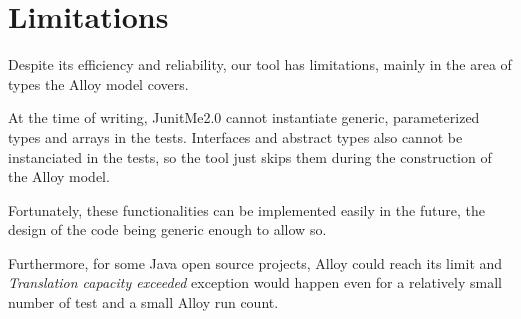 \section{Limitations}
	Despite its efficiency and reliability, our tool has limitations, mainly in the area of types the Alloy model covers.
	
	At the time of writing, JunitMe2.0 cannot instantiate generic, parameterized types and arrays in the tests.
	Interfaces and abstract types also cannot be instanciated in the tests, so the tool just skips them during the construction of the Alloy model.
	
	Fortunately, these functionalities can be implemented easily in the future, the design of the code being generic enough to allow so.
	
	Furthermore, for some Java open source projects, Alloy could reach its limit and \textit{Translation capacity exceeded} exception would happen even for a relatively small number of test and a small Alloy run count. 